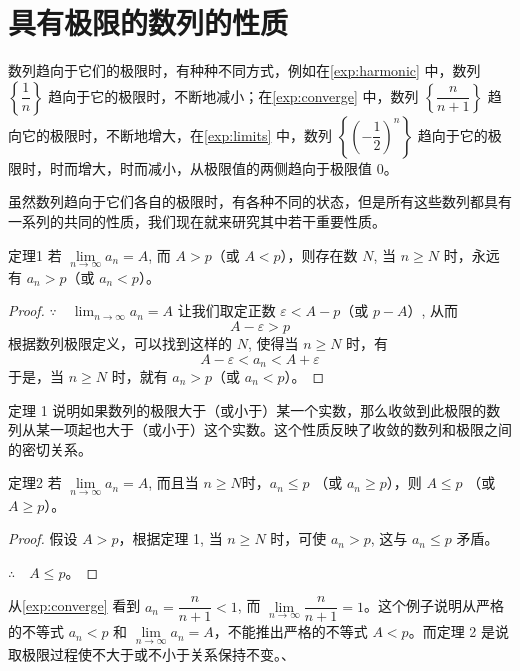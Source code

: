 \section{具有极限的数列的性质}
数列趋向于它们的极限时，有种种不同方式，例如在\cref{exp:harmonic} 中，数列 $\left\{\dfrac{1}{n}\right\}$ 趋向于它的极限时，不断地减小；在\cref{exp:converge} 中，数列 $\left\{\dfrac{n}{n+1}\right\}$ 趋向它的极限时，不断地增大，在\cref{exp:limits} 中，数列 $\left\{\left(-\dfrac{1}{2}\right)^n\right\}$ 趋向于它的极限时，时而增大，时而减小，从极限值的两侧趋向于极限值 0。

\medskip
虽然数列趋向于它们各自的极限时，有各种不同的状态，但是所有这些数列都具有一系列的共同的性质，我们现在就来研究其中若干重要性质。

\begin{Theorem}{定理1}
  若 $\lim\limits_{n\to\infty}a_n=A$, 而 $A>p$（或 $A<p$），则存在数 $N$, 当 $n\geqslant N$ 时，永远有 $a_n>p$（或 $a_n<p$）。
\end{Theorem}

\begin{proof}
$\because\quad \lim_{n\to\infty}a_n=A$
让我们取定正数 $\varepsilon<A-p$（或 $p-A$）, 从而
\[ A-\varepsilon>p \]
根据数列极限定义，可以找到这样的 $N$, 使得当 $n\geqslant N$ 时，有
\[A-\varepsilon<a_n<A+\varepsilon\]
于是，当 $n \geqslant N$ 时，就有 $a_n>p$（或 $a_n<p$）。    
\end{proof}

定理 1 说明如果数列的极限大于（或小于）某一个实数，那么收敛到此极限的数列从某一项起也大于（或小于）这个实数。这个性质反映了收敛的数列和极限之间的密切关系。

\begin{Theorem}{定理2}
若 $\lim\limits_{n\to\infty}a_n=A$, 而且当 $n\geqslant N$时，$a_n\leqslant p$ （或 $a_n\geqslant p$），则 $A\leqslant p$ （或 $A\geqslant p$）。
\end{Theorem}

\begin{proof}
 假设 $A>p$，根据定理 1, 当 $n\geqslant N$ 时，可使 $a_n>p$, 这与 $a_n\leqslant p$ 矛盾。

$\therefore\quad A\leqslant p$。
\end{proof}

{\linespread{1.6}\selectfont
从\cref{exp:converge} 看到 $a_n=\dfrac{n}{n+1}<1$, 而 $\lim\limits_{n\to\infty}\dfrac{n}{n+1}=1$。这个例子说明从严格的不等式 $a_n<p$ 和 $\lim\limits_{n\to\infty}a_n=A$，不能推出严格的不等式 $A<p$。而定理 2 是说取极限过程使不大于或不小于关系保持不变。、\par}

